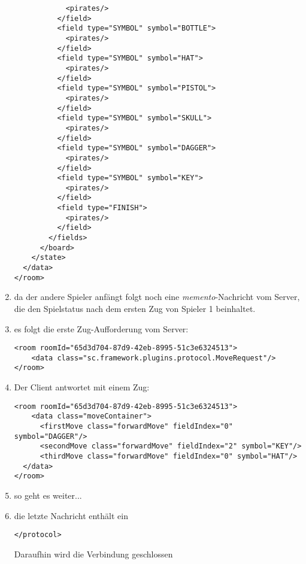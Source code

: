 \documentclass[12pt,a4paper, ngerman, oneside]{scrartcl}
\begin{document}
\begin{enumerate}
\begin{verbatim}
            <pirates/>
          </field>
          <field type="SYMBOL" symbol="BOTTLE">
            <pirates/>
          </field>
          <field type="SYMBOL" symbol="HAT">
            <pirates/>
          </field>
          <field type="SYMBOL" symbol="PISTOL">
            <pirates/>
          </field>
          <field type="SYMBOL" symbol="SKULL">
            <pirates/>
          </field>
          <field type="SYMBOL" symbol="DAGGER">
            <pirates/>
          </field>
          <field type="SYMBOL" symbol="KEY">
            <pirates/>
          </field>
          <field type="FINISH">
            <pirates/>
          </field>
        </fields>
      </board>
    </state>
  </data>
</room>
\end{verbatim}
\item da der andere Spieler anfängt folgt noch eine \textit{memento}-Nachricht vom Server, die den Spielstatus nach dem ersten Zug von Spieler 1 beinhaltet.
\item es folgt die erste Zug-Aufforderung vom Server: \begin{verbatim}
<room roomId="65d3d704-87d9-42eb-8995-51c3e6324513">
    <data class="sc.framework.plugins.protocol.MoveRequest"/>
</room>
\end{verbatim}
\item Der Client antwortet mit einem Zug: \begin{verbatim}
<room roomId="65d3d704-87d9-42eb-8995-51c3e6324513">
    <data class="moveContainer">
      <firstMove class="forwardMove" fieldIndex="0" symbol="DAGGER"/>
      <secondMove class="forwardMove" fieldIndex="2" symbol="KEY"/>
      <thirdMove class="forwardMove" fieldIndex="0" symbol="HAT"/>
  </data>
</room>
\end{verbatim}
\item so geht es weiter...
\item die letzte Nachricht enthält ein \begin{verbatim}
</protocol>
\end{verbatim}
Daraufhin wird die Verbindung geschlossen
\end{enumerate}
\end{document}
